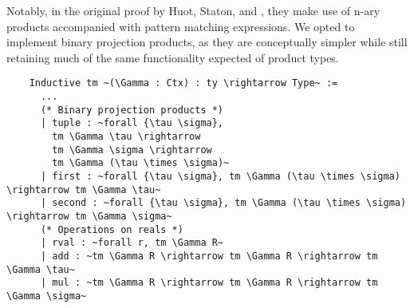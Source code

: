   Notably, in the original proof by Huot, Staton, and \Vakar{} \cite{huot2020correctness}, they make use of n-ary products accompanied with pattern matching expressions.
  We opted to implement binary projection products, as they are conceptually simpler while still retaining much of the same functionality expected of product types.

  \begin{verbatim}
    Inductive tm ~(\Gamma : Ctx) : ty \rightarrow Type~ :=
      ...
      (* Binary projection products *)
      | tuple : ~forall {\tau \sigma},
        tm \Gamma \tau \rightarrow
        tm \Gamma \sigma \rightarrow
        tm \Gamma (\tau \times \sigma)~
      | first : ~forall {\tau \sigma}, tm \Gamma (\tau \times \sigma) \rightarrow tm \Gamma \tau~
      | second : ~forall {\tau \sigma}, tm \Gamma (\tau \times \sigma) \rightarrow tm \Gamma \sigma~
      (* Operations on reals *)
      | rval : ~forall r, tm \Gamma R~
      | add : ~tm \Gamma R \rightarrow tm \Gamma R \rightarrow tm \Gamma \tau~
      | mul : ~tm \Gamma R \rightarrow tm \Gamma R \rightarrow tm \Gamma \sigma~
  \end{verbatim}





